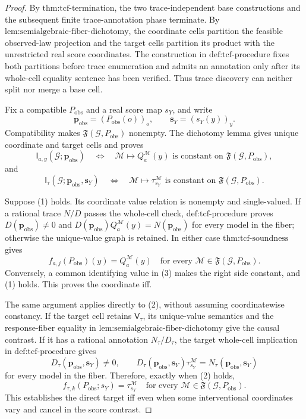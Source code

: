 \documentclass{article}
\begin{document}
\begin{proof}
By \(\text{thm:tcf-termination}\), the two trace-independent base constructions and the subsequent finite trace-annotation phase terminate.  By \(\text{lem:semialgebraic-fiber-dichotomy}\), the coordinate cells partition the feasible observed-law projection and the target cells partition its product with the unrestricted real score coordinates.  The construction in \(\text{def:tcf-procedure}\) fixes both partitions before trace enumeration and admits an annotation only after its whole-cell equality sentence has been verified.  Thus trace discovery can neither split nor merge a base cell.

Fix a compatible \(P_{\mathrm{obs}}\) and a real score map \(s_Y\), and write
\[
\mathbf p_{\mathrm{obs}}=(P_{\mathrm{obs}}(o))_o,
\qquad
\mathbf s_Y=(s_Y(y))_y.
\]
Compatibility makes \(\mathfrak F(\mathcal G,P_{\mathrm{obs}})\) nonempty.  The dichotomy lemma gives unique coordinate and target cells and proves
\[
\mathsf I_{a,y}(\mathcal G;\mathbf p_{\mathrm{obs}})
\quad\Longleftrightarrow\quad
\mathcal M\mapsto Q_a^{\mathcal M}(y)
\text{ is constant on }\mathfrak F(\mathcal G,P_{\mathrm{obs}}),
\tag{1}
\]
and
\[
\mathsf I_\tau(\mathcal G;\mathbf p_{\mathrm{obs}},\mathbf s_Y)
\quad\Longleftrightarrow\quad
\mathcal M\mapsto\tau_{s_Y}^{\mathcal M}
\text{ is constant on }\mathfrak F(\mathcal G,P_{\mathrm{obs}}).
\tag{2}
\]

Suppose (1) holds.  Its coordinate value relation is nonempty and single-valued.  If a rational trace \(N/D\) passes the whole-cell check, \(\text{def:tcf-procedure}\) proves \(D(\mathbf p_{\mathrm{obs}})\neq0\) and \(D(\mathbf p_{\mathrm{obs}})Q_a^{\mathcal M}(y)=N(\mathbf p_{\mathrm{obs}})\) for every model in the fiber; otherwise the unique-value graph is retained.  In either case \(\text{thm:tcf-soundness}\) gives
\[
f_{a,j}(P_{\mathrm{obs}})(y)=Q_a^{\mathcal M}(y)
\quad\text{for every }\mathcal M\in\mathfrak F(\mathcal G,P_{\mathrm{obs}}).
\tag{3}
\]
Conversely, a common identifying value in (3) makes the right side constant, and (1) holds.  This proves the coordinate iff.

The same argument applies directly to (2), without assuming coordinatewise constancy.  If the target cell retains \(\mathsf V_\tau\), its unique-value semantics and the response-fiber equality in \(\text{lem:semialgebraic-fiber-dichotomy}\) give the causal contrast.  If it has a rational annotation \(N_\tau/D_\tau\), the target whole-cell implication in \(\text{def:tcf-procedure}\) gives
\[
D_\tau(\mathbf p_{\mathrm{obs}},\mathbf s_Y)\neq0,
\qquad
D_\tau(\mathbf p_{\mathrm{obs}},\mathbf s_Y)\tau_{s_Y}^{\mathcal M}
=N_\tau(\mathbf p_{\mathrm{obs}},\mathbf s_Y)
\tag{4}
\]
for every model in the fiber.  Therefore, exactly when (2) holds,
\[
f_{\tau,k}(P_{\mathrm{obs}};s_Y)=\tau_{s_Y}^{\mathcal M}
\quad\text{for every }\mathcal M\in\mathfrak F(\mathcal G,P_{\mathrm{obs}}).
\tag{5}
\]
This establishes the direct target iff even when some interventional coordinates vary and cancel in the score contrast.


\end{proof}
\end{document}
